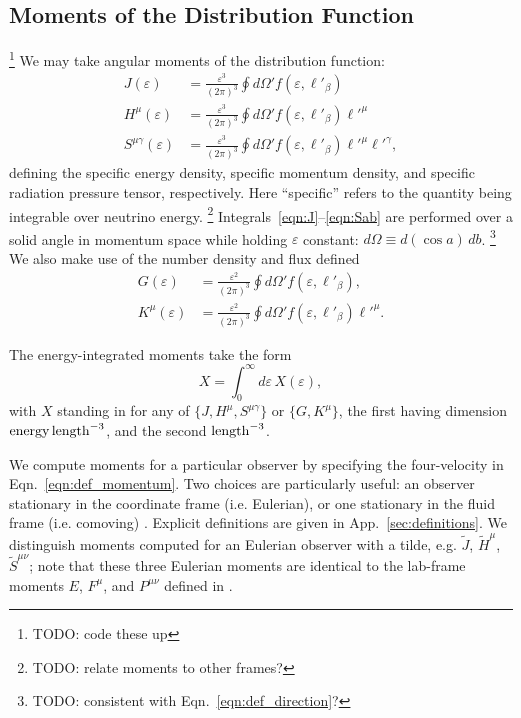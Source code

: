 \documentclass[aps,floatfix,prd,superscriptaddress,twocolumn]{revtex4-1}
\begin{document}
\subsection{Moments of the Distribution Function}
\label{ssec:moments}
\footnote{TODO: code these up}
We may take angular moments of the distribution function:
\begin{align}
  \label{eqn:J}
  J(\varepsilon) &=
  \frac{\varepsilon^3}{(2\pi)^3} \oint d\Omega' f(\varepsilon, \ell'_\beta) \\
  \label{eqn:Ha}
  H^\mu(\varepsilon) &=
  \frac{\varepsilon^3}{(2\pi)^3} \oint d\Omega' f(\varepsilon, \ell'_\beta) \ell'^\mu \\
  \label{eqn:Sab}
  S^{\mu\gamma}(\varepsilon) &=
  \frac{\varepsilon^3}{(2\pi)^3} \oint d\Omega' f(\varepsilon, \ell'_\beta) \ell'^\mu \ell'^\gamma,
\end{align}
defining the specific energy density,
specific momentum density, and
specific radiation pressure tensor, respectively.
Here ``specific'' refers to the quantity being integrable over neutrino energy.
\footnote{TODO: relate moments to other frames?}
Integrals~\ref{eqn:J}--\ref{eqn:Sab} are performed over a solid angle in
momentum space while holding $\varepsilon$ constant:
$d\Omega \equiv d(\cos a)\,db$.
\footnote{TODO: consistent with Eqn.~\ref{eqn:def_direction}?}
We also make use of the number density and flux defined
\begin{align}
  \label{eqn:G}
  G(\varepsilon) &=
  \frac{\varepsilon^2}{(2\pi)^3} \oint d\Omega' f(\varepsilon, \ell'_\beta), \\
  \label{eqn:Ka}
  K^\mu(\varepsilon) &=
  \frac{\varepsilon^2}{(2\pi)^3} \oint d\Omega' f(\varepsilon, \ell'_\beta) \ell'^\mu.
\end{align}

The energy-integrated moments take the form
\begin{equation}
  \label{eqn:J_H_S_eps_integrated}
  X = \int_0^\infty d\varepsilon \, X(\varepsilon),
\end{equation}
with $X$ standing in for any of $\{J,H^\mu,S^{\mu\gamma}\}$ or
$\{G,K^\mu\}$,
the first having dimension ${\rm energy}\,{\rm length}^{-3}$,
and the second ${\rm length}^{-3}$.

We compute moments for a particular observer
by specifying the four-velocity in Eqn.~\ref{eqn:def_momentum}.
Two choices are particularly useful:
an observer stationary in the coordinate frame (i.e. Eulerian),
or one stationary in the fluid frame (i.e. comoving)
\cite{smar1980-gr_hydro}.
Explicit definitions are given in App.~\ref{sec:definitions}.
We distinguish moments computed for an Eulerian observer with a tilde,
e.g. $\tilde{J}$, $\tilde{H}^\mu$, $\tilde{S}^{\mu\nu}$;
note that these three Eulerian moments are identical to the lab-frame moments
$E$, $F^\mu$, and $P^{\mu\nu}$
defined in
\cite{shib2011-truncated_moment, ocon2015-gr1d_with_nu, fouc2015-m1_nsbh}.
\end{document}
